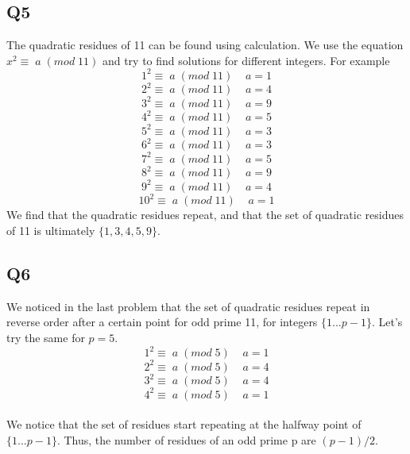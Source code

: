 \documentclass[12pt, oneside]{article}
\begin{document}
\subsection*{Q5}
The quadratic residues of 11 can be found using calculation. We use the equation $x^{2}\equiv\;a\;(mod\;11)$ and try to find solutions for different integers. For example
\[1^{2}\equiv\;a\;(mod\;11)\;\;\;\;a=1\]
\[2^{2}\equiv\;a\;(mod\;11)\;\;\;\;a=4\]
\[3^{2}\equiv\;a\;(mod\;11)\;\;\;\;a=9\]
\[4^{2}\equiv\;a\;(mod\;11)\;\;\;\;a=5\]
\[5^{2}\equiv\;a\;(mod\;11)\;\;\;\;a=3\]
\[6^{2}\equiv\;a\;(mod\;11)\;\;\;\;a=3\]
\[7^{2}\equiv\;a\;(mod\;11)\;\;\;\;a=5\]
\[8^{2}\equiv\;a\;(mod\;11)\;\;\;\;a=9\]
\[9^{2}\equiv\;a\;(mod\;11)\;\;\;\;a=4\]
\[10^{2}\equiv\;a\;(mod\;11)\;\;\;\;a=1\]
 We find that the quadratic residues repeat, and that the set of quadratic residues of 11 is ultimately $\{1,3,4,5,9\}$.

\subsection*{Q6}
We noticed in the last problem that the set of quadratic residues repeat in reverse order after a certain point for odd prime 11, for integers $\{1...p-1\}$. Let's try the same for $p=5$.
\[1^{2}\equiv\;a\;(mod\;5)\;\;\;\;a=1\]
\[2^{2}\equiv\;a\;(mod\;5)\;\;\;\;a=4\]
\[3^{2}\equiv\;a\;(mod\;5)\;\;\;\;a=4\]
\[4^{2}\equiv\;a\;(mod\;5)\;\;\;\;a=1\]
\\
We notice that the set of residues start repeating at the halfway point of $\{1...p-1\}$. Thus, the number of residues of an odd prime p are $(p-1)/2$.
\end{document}
